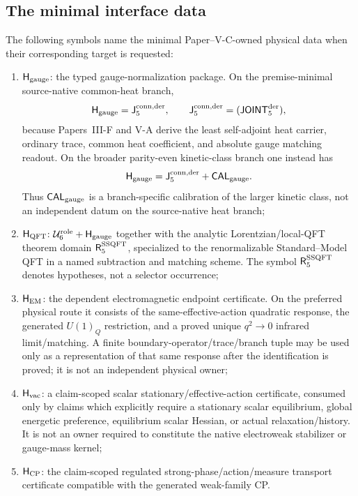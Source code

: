 \documentclass[12pt,a4paper]{article}
\newcommand{\Hqft}{\mathsf{H}_{\rm QFT}}
\newcommand{\Hem}{\mathsf{H}_{\rm EM}}
\newcommand{\Hvac}{\mathsf{H}_{\rm vac}}
\newcommand{\Hcp}{\mathsf{H}_{\rm CP}}
\newcommand{\Hgauge}{\mathsf{H}_{\rm gauge}}
\newcommand{\Rconn}{\mathsf J_5^{\rm conn,der}}
\newcommand{\Rssqft}{\mathsf R_5^{\rm SSQFT}}
\newcommand{\JOINTfiveocc}{\mathsf{JOINT}_{5}^{\rm der}}
\newcommand{\CALgauge}{\mathsf{CAL}_{\rm gauge}}
\newcommand{\Urole}{\mathcal U_6^{\rm role}}
\begin{document}
\subsection{The minimal interface data}
\label{p7v2:sec:minimal-interface-data}

\begin{definition}
\label{p7v2:def:interface-hypotheses}
The following symbols name the minimal Paper--V-C-owned physical data when
their corresponding target is requested:
\begin{enumerate}[label=(\roman*),leftmargin=2.5em]
  \item \(\Hgauge\): the typed gauge-normalization package.  On the
  premise-minimal source-native common-heat branch,
  \[
    \Hgauge=\Rconn,
    \qquad \Rconn=(\JOINTfiveocc),
  \]
  because Papers~III-F and V-A derive the least self-adjoint heat carrier,
  ordinary trace, common heat coefficient, and absolute gauge matching
  readout.  On the broader parity-even kinetic-class branch one instead has
  \[
    \Hgauge=\Rconn+\CALgauge.
  \]
  Thus \(\CALgauge\) is a branch-specific calibration of the larger kinetic
  class, not an independent datum on the source-native heat branch;
  \item \(\Hqft\): \(\Urole+\Hgauge\) together with the analytic Lorentzian/local-QFT
  theorem domain \(\Rssqft\), specialized to the renormalizable
  Standard--Model QFT in a named subtraction and matching scheme.  The symbol
  \(\Rssqft\) denotes hypotheses, not a selector occurrence;
  \item \(\Hem\): the dependent electromagnetic endpoint certificate.  On the
  preferred physical route it consists of the same-effective-action quadratic
  response, the generated $U(1)_Q$ restriction, and a proved unique
  $q^2\to0$ infrared limit/matching.  A finite boundary-operator/trace/branch
  tuple may be used only as a representation of that same response after the
  identification is proved; it is not an independent physical owner;
  \item \(\Hvac\): a claim-scoped scalar stationary/effective-action
  certificate, consumed only by claims which explicitly require a stationary
  scalar equilibrium, global energetic preference, equilibrium scalar Hessian,
  or actual relaxation/history.  It is not an owner required to constitute the
  native electroweak stabilizer or gauge-mass kernel;
  \item \(\Hcp\): the claim-scoped regulated strong-phase/action/measure
  transport certificate compatible with the generated weak-family CP.

\end{enumerate}
\end{definition}
\end{document}
